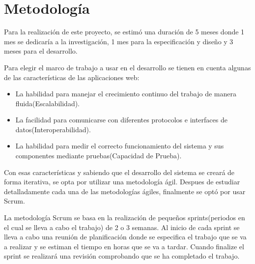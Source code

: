 \chapter{Metodología}

Para la realización de este proyecto, se estimó una duración de 5 meses donde 1 mes se dedicaría a la investigación, 1 mes para la especificación y diseño y 3 meses para el desarrollo. 

\vspace{5 mm}

Para elegir el marco de trabajo a usar en el desarrollo se tienen en cuenta algunas de las características de las aplicaciones web:

\begin{itemize}

\item La habilidad para manejar el crecimiento continuo del trabajo de manera fluida(Escalabilidad).  

\item La facilidad para comunicarse con diferentes protocolos e interfaces de datos(Interoperabilidad). 

\item La habilidad para medir el correcto funcionamiento del sistema y sus componentes mediante pruebas(Capacidad de Prueba). 

\end{itemize}


\vspace{5 mm}

 Con esas características y sabiendo que el desarrollo del sistema se creará de forma iterativa, se opta por utilizar una metodología ágil. Despues de estudiar detalladamente cada una de las metodologías ágiles, finalmente se optó por usar Scrum.

\vspace{5 mm}

La metodología Scrum se basa en la realización de pequeños sprints(periodos en el cual se lleva a cabo el trabajo) de 2 o 3 semanas. Al inicio de cada sprint se lleva a cabo una reunión de planificación donde se especifica el trabajo que se va a realizar y se estiman el tiempo en horas que se va a tardar. Cuando finalize el sprint se realizará una revisión comprobando que se ha completado el trabajo.


